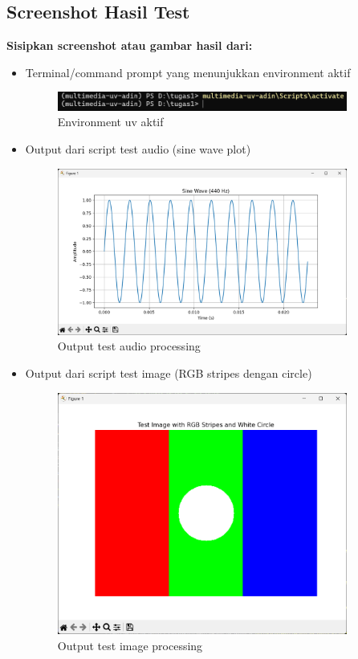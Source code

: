 \documentclass[11pt,a4paper]{article}
\begin{document}
\subsection{Screenshot Hasil Test}
\textbf{Sisipkan screenshot atau gambar hasil dari:}
\begin{itemize}
    \item Terminal/command prompt yang menunjukkan environment aktif
    \begin{figure}[H]
        \centering
        \includegraphics[width=0.9\textwidth]{image/activate.png}
        \caption{Environment uv aktif}
    \end{figure}

    \item Output dari script test audio (sine wave plot)
    \begin{figure}[H]
        \centering
        \includegraphics[width=0.9\textwidth]{image/figure_audio.png}
        \caption{Output test audio processing}
    \end{figure}

    \newpage
    \item Output dari script test image (RGB stripes dengan circle)
    \begin{figure}[H]
        \centering
        \includegraphics[width=0.9\textwidth]{image/figure_image.png}
        \caption{Output test image processing}
    \end{figure}
\end{itemize}
\end{document}
